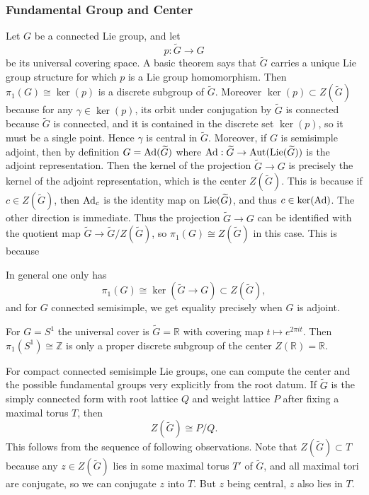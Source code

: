 \documentclass[12pt]{article}
\begin{document}
\subsubsection{Fundamental Group and Center}

Let $G$ be a connected Lie group, and let
\[
    p:\widetilde G \to G
\]
be its universal covering space. A basic theorem says that $\widetilde G$ carries a unique Lie group structure for which $p$ is a Lie group homomorphism. Then $\pi_1(G) \cong \ker(p)$ is a discrete subgroup of $\widetilde G$. Moreover $\ker(p) \subset Z(\widetilde G)$ because for any $\gamma \in \ker(p)$, its orbit under conjugation by $\widetilde G$ is connected because $\widetilde G$ is connected, and it is contained in the discrete set $\ker(p)$, so it must be a single point. Hence $\gamma$ is central in $\widetilde G$. Moreover, if $G$ is semisimple adjoint, then by definition $G = \operatorname{Ad}(\widetilde G)$ where $\operatorname{Ad} : \widetilde G \to \mathrm{Aut}(\operatorname{Lie}(\widetilde G))$ is the adjoint representation. Then the kernel of the projection $\widetilde G \to G$ is precisely the kernel of the adjoint representation, which is the center $Z(\widetilde G)$. This is because if $c\in Z(\widetilde G)$, then $\operatorname{Ad}_c$ is the identity map on $\operatorname{Lie}(\widetilde G)$, and thus $c\in \ker(\operatorname{Ad})$. The other direction is immediate. Thus the projection $\widetilde G \to G$ can be identified with the quotient map $\widetilde G \to \widetilde G/Z(\widetilde G)$, so $\pi_1(G)\cong Z(\widetilde G)$ in this case. This is because

In general one only has
\[
    \pi_1(G)\cong \ker(\widetilde G\to G)\subset Z(\widetilde G),
\]
and for $G$ connected semisimple, we get equality precisely when $G$ is adjoint.

\begin{example}
    For $G=S^1$
    the universal cover is $\widetilde G=\mathbb R$
    with covering map $t\mapsto e^{2\pi i t}$. Then $\pi_1(S^1)\cong \mathbb Z$ is only a proper discrete subgroup of the center $Z(\mathbb R)=\mathbb R$.
\end{example}

For compact connected semisimple Lie groups, one can compute the center and the possible fundamental groups very explicitly from the root datum. If $\widetilde G$ is the simply connected form with root lattice $Q$ and weight lattice $P$ after fixing a maximal torus $T$, then
\[
    Z(\widetilde G)\cong P/Q.
\]
This follows from the sequence of following observations. Note that $Z(\widetilde G)\subset T$ because any $z\in Z(\widetilde G)$ lies in some maximal torus $T'$ of $\widetilde G$, and all maximal tori are conjugate, so we can conjugate $z$ into $T$. But $z$ being central, $z$ also lies in $T$.
\end{document}
